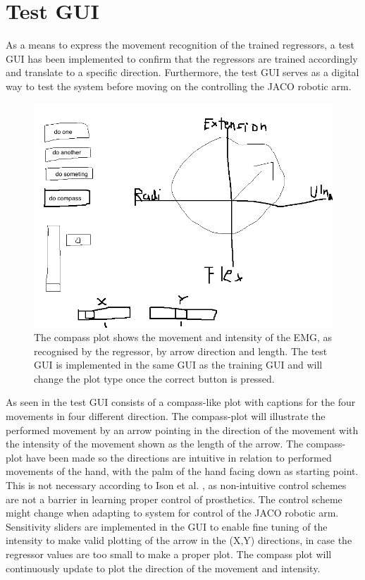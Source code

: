 \section{Test GUI} \label{sec:testGUI}

As a means to express the movement recognition of the trained regressors, a test GUI has been implemented to confirm that the regressors are trained accordingly and translate to a specific direction. Furthermore, the test GUI serves as a digital way to test the system before moving on the controlling the JACO robotic arm. 

\begin{figure}[H]
	\includegraphics[width=.4\textwidth]{figures/GUI/GUI_test.png}  %
	\caption{The compass plot shows the movement and intensity of the EMG, as recognised by the regressor, by arrow direction and length. The test GUI is implemented in the same GUI as the training GUI and will change the plot type once the correct button is pressed.}
	\label{fig:testGUI}
\end{figure}

As seen in  the test GUI consists of a compass-like plot with captions for the four movements in four different direction. The compass-plot will illustrate the performed movement by an arrow pointing in the direction of the movement with the intensity of the movement shown as the length of the arrow. The compass-plot have been made so the directions are intuitive in relation to performed movements of the hand, with the palm of the hand facing down as starting point. This is not necessary according to Ison et al. \cite{Ison2016}, as non-intuitive control schemes are not a barrier in learning proper control of prosthetics. The control scheme might change when adapting to system for control of the JACO robotic arm. Sensitivity sliders are implemented in the GUI to enable fine tuning of the intensity to make valid plotting of the arrow in the (X,Y) directions, in case the regressor values are too small to make a proper plot. 
The compass plot will continuously update to plot the direction of the movement and intensity. 
